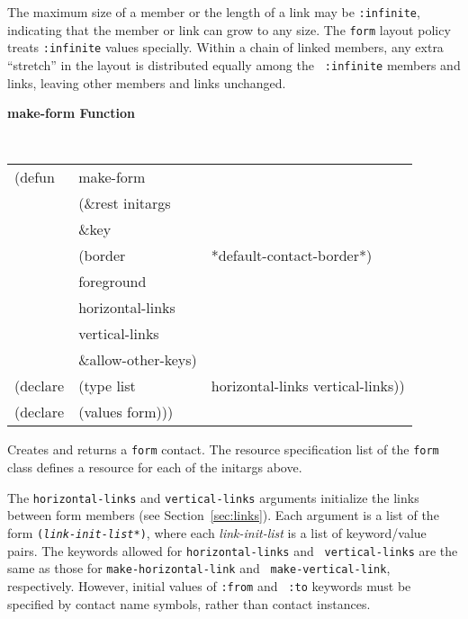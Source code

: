 The maximum size of a member or the length of a link may be {\tt :infinite},
indicating that the member or link can grow to any size.  The {\tt form} layout
policy treats {\tt :infinite} values specially.  Within a chain of linked members,
any extra ``stretch'' in the layout is distributed equally among the {\tt
:infinite} members and links, leaving other members and links unchanged.


{\samepage
{\large {\bf make-form \hfill Function}} 
\begin{flushright} \parbox[t]{6.125in}{
\tt
\begin{tabular}{lll}
\raggedright
(defun & make-form \\
       & (\&rest initargs \\
       & \&key  \\ 
       & (border                & *default-contact-border*) \\ 
       & foreground \\
       & horizontal-links \\
       & vertical-links \\
       & \&allow-other-keys) \\
(declare &(type list& horizontal-links vertical-links))\\
(declare & (values   form)))
\end{tabular}
\rm

}\end{flushright}}

\begin{flushright} \parbox[t]{6.125in}{
Creates and returns a {\tt form} contact.
The resource specification list of the {\tt form} class defines
a resource for each of the initargs above.

The {\tt horizontal-links} and {\tt vertical-links} arguments initialize the links
between form members (see Section~\ref{sec:links}).  Each argument is a list of
the form {\tt ({\em link-init-list}*)}, where each {\em link-init-list} is a list
of keyword/value pairs.  The keywords allowed for {\tt horizontal-links} and {\tt
vertical-links} are the same as those for {\tt make-horizontal-link} and {\tt
make-vertical-link}, respectively. However, initial values of {\tt :from} and {\tt
:to} keywords must be specified by contact name symbols, rather than contact
instances.

}\end{flushright}





